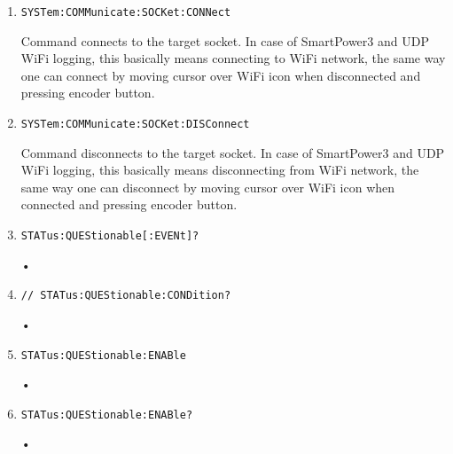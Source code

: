 \documentclass[a4paper,10pt]{article}
\begin{document}
\begin{enumerate}
\begin{enumerate}
		\item
		    \begin{verbatim}SYSTem:COMMunicate:SOCKet:CONNect\end{verbatim}
		    \begin{description}
		        Command connects to the target socket. In case of SmartPower3 and UDP WiFi logging, this basically means connecting to WiFi network, the same way one can connect by moving cursor over WiFi icon when disconnected and pressing encoder button.
		    \end{description}
		\item 
		    \begin{verbatim}SYSTem:COMMunicate:SOCKet:DISConnect\end{verbatim}
		    \begin{description}
		        Command disconnects to the target socket. In case of SmartPower3 and UDP WiFi logging, this basically means disconnecting from WiFi network, the same way one can disconnect by moving cursor over WiFi icon when connected and pressing encoder button.
		    \end{description}



		\item 
		    \begin{verbatim}STATus:QUEStionable[:EVENt]?\end{verbatim}
		    \begin{description}
		        •
		    \end{description}
		\item
		    \begin{verbatim}// STATus:QUEStionable:CONDition?\end{verbatim}
		    \begin{description}
		        •
		    \end{description}
		\item 
		    \begin{verbatim}STATus:QUEStionable:ENABle\end{verbatim}
		    \begin{description}
		        •
		    \end{description}
		\item 
		    \begin{verbatim}STATus:QUEStionable:ENABle?\end{verbatim}
		    \begin{description}
		        •
		    \end{description}


\end{enumerate}
\end{enumerate}
\end{document}

